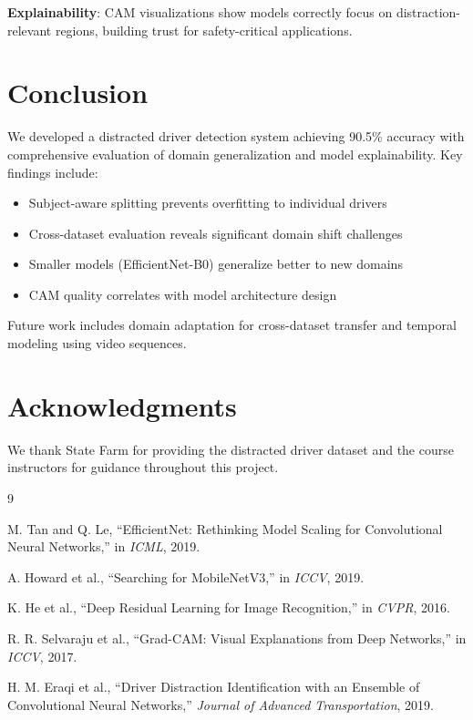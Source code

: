 \documentclass[conference]{IEEEtran}
\begin{document}
\textbf{Explainability}: CAM visualizations show models correctly focus on distraction-relevant regions, building trust for safety-critical applications.

\section{Conclusion}

We developed a distracted driver detection system achieving 90.5\% accuracy with comprehensive evaluation of domain generalization and model explainability. Key findings include:

\begin{itemize}
    \item Subject-aware splitting prevents overfitting to individual drivers
    \item Cross-dataset evaluation reveals significant domain shift challenges
    \item Smaller models (EfficientNet-B0) generalize better to new domains
    \item CAM quality correlates with model architecture design
\end{itemize}

Future work includes domain adaptation for cross-dataset transfer and temporal modeling using video sequences.

\section{Acknowledgments}

We thank State Farm for providing the distracted driver dataset and the course instructors for guidance throughout this project.

\begin{thebibliography}{9}

M. Tan and Q. Le, ``EfficientNet: Rethinking Model Scaling for Convolutional Neural Networks,'' in \textit{ICML}, 2019.

A. Howard et al., ``Searching for MobileNetV3,'' in \textit{ICCV}, 2019.

K. He et al., ``Deep Residual Learning for Image Recognition,'' in \textit{CVPR}, 2016.

R. R. Selvaraju et al., ``Grad-CAM: Visual Explanations from Deep Networks,'' in \textit{ICCV}, 2017.

H. M. Eraqi et al., ``Driver Distraction Identification with an Ensemble of Convolutional Neural Networks,'' \textit{Journal of Advanced Transportation}, 2019.

\end{thebibliography}
\end{document}

